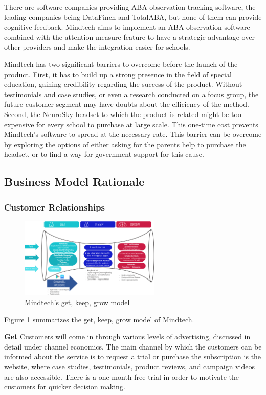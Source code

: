 \documentclass[letterpaper,10pt]{article}
\let\oldsubsection\subsection
\renewcommand{\subsection}{\def\cursectioning{subsection}\oldsubsection}
\begin{document}
There are software companies providing ABA observation tracking software, the leading companies being DataFinch and TotalABA, but none of them can provide cognitive feedback. Mindtech aims to implement an ABA observation software combined with the attention measure feature to have a strategic advantage over other providers and make the integration easier for schools.

Mindtech has two significant barriers to overcome before the launch of the product. First, it has to build up a strong presence in the field of special education, gaining credibility regarding the success of the product. Without testimonials and case studies, or even a research conducted on a focus group, the future customer segment may have doubts about the efficiency of the method. Second, the NeuroSky headset to which the product is related might be too expensive for every school to purchase at large scale. This one-time cost prevents Mindtech's software to spread at the necessary rate. This barrier can be overcome by exploring the options of either asking for the parents help to purchase the headset, or to find a way for government support for this cause.


\subsection{Business Model Rationale}
\subsubsection{Customer Relationships}


\begin{figure}
\centering
\includegraphics[width=0.6\textwidth]{gkg.PNG}
\caption{Mindtech's get, keep, grow model}
\label{img:gkg}
\end{figure}

Figure \ref{img:gkg} summarizes the get, keep, grow model of Mindtech.

\textbf{Get} Customers will come in through various levels of advertising, discussed in detail under channel economics. The main channel by which the customers can be informed about the service is to request a trial or purchase the subscription is the website, where case studies, testimonials, product reviews, and campaign videos are also accessible. There is a one-month free trial in order to motivate the customers for quicker decision making. 
\end{document}
